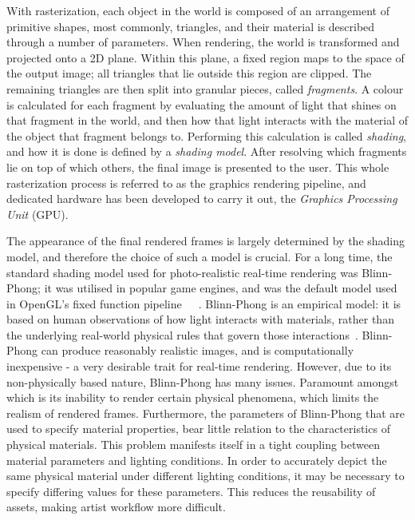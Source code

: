 With rasterization, each object in the world is composed of an arrangement of primitive shapes, most commonly, triangles, and their material is described through a number of parameters. When rendering, the world is transformed and projected onto a 2D plane. Within this plane, a fixed region maps to the space of the output image; all triangles that lie outside this region are clipped. The remaining triangles are then split into granular pieces, called \textit{fragments}. A colour is calculated for each fragment by evaluating the amount of light that shines on that fragment in the world, and then how that light interacts with the material of the object that fragment belongs to. Performing this calculation is called \textit{shading}, and how it is done is defined by a \textit{shading model}. After resolving which fragments lie on top of which others, the final image is presented to the user. This whole rasterization process is referred to as the graphics rendering pipeline, and dedicated hardware has been developed to carry it out, the \textit{Graphics Processing Unit} (GPU).

The appearance of the final rendered frames is largely determined by the shading model, and therefore the choice of such a model is crucial. For a long time, the standard shading model used for photo-realistic real-time rendering was Blinn-Phong; it was utilised in popular game engines, and was the default model used in OpenGL's fixed function pipeline~\cite{UnityBlinnPhong}~\cite{UnrealBlinnPhong}~\cite{OpenGLBlinnPhongFixedFunction}. Blinn-Phong is an empirical model: it is based on human observations of how light interacts with materials, rather than the underlying real-world physical rules that govern those interactions~\cite{PhongShading}. Blinn-Phong can produce reasonably realistic images, and is computationally inexpensive - a very desirable trait for real-time rendering. However, due to its non-physically based nature, Blinn-Phong has many issues. Paramount amongst which is its inability to render certain physical phenomena, which limits the realism of rendered frames. Furthermore, the parameters of Blinn-Phong that are used to specify material properties, bear little relation to the characteristics of physical materials. This problem manifests itself in a tight coupling between material parameters and lighting conditions. In order to accurately depict the same physical material under different lighting conditions, it may be necessary to specify differing values for these parameters. This reduces the reusability of assets, making artist workflow more difficult.

